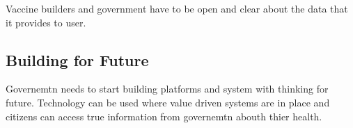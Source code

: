 \documentclass{article}
\begin{document}
Vaccine builders and government have to be open and clear about the data that it provides to user.

\subsection{Building for Future}

Governemtn needs to start building platforms and system with thinking for future. Technology can be used where value driven systems are in place and citizens can access true information from governemtn abouth thier health.	
  




\end{document}
